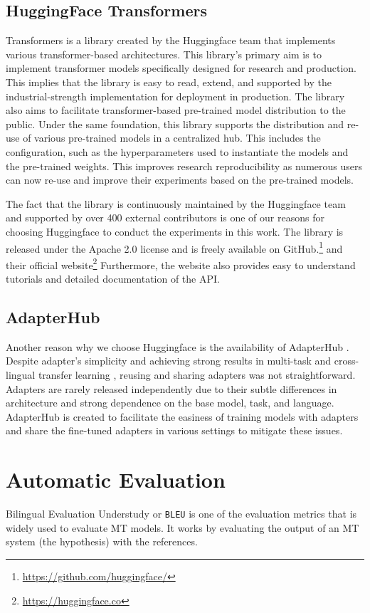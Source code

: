 \subsection{HuggingFace Transformers}
Transformers  is a library created by the Huggingface team that implements various transformer-based architectures. This library's primary aim is to implement transformer models specifically designed for research and production. This implies that the library is easy to read, extend, and supported by the industrial-strength implementation for deployment in production. The library also aims to facilitate transformer-based pre-trained model distribution to the public. Under the same foundation, this library supports the distribution and re-use of various pre-trained models in a centralized hub. This includes the configuration, such as the hyperparameters used to instantiate the models and the pre-trained weights. This improves research reproducibility as numerous users can now re-use and improve their experiments based on the pre-trained models.

The fact that the library is continuously maintained by the Huggingface team and supported by over 400 external contributors is one of our reasons for choosing Huggingface to conduct the experiments in this work. The library is released under the Apache 2.0 license and is freely available on GitHub.\footnote{\url{https://github.com/huggingface/}} and their official website\footnote{\url{https://huggingface.co}} Furthermore, the website also provides easy to understand tutorials and detailed documentation of the API.

\subsection{AdapterHub}
Another reason why we choose Huggingface is the availability of AdapterHub . Despite adapter's simplicity and achieving strong results in multi-task and cross-lingual transfer learning , reusing and sharing adapters was not straightforward. Adapters are rarely released independently due to their subtle differences in architecture and strong dependence on the base model, task, and language. AdapterHub is created to facilitate the easiness of training models with adapters and share the fine-tuned adapters in various settings to mitigate these issues.

\section{Automatic Evaluation}
\label{sec:aeval}
Bilingual Evaluation Understudy or \texttt{BLEU}  is one of the evaluation metrics that is widely used to evaluate MT models. It works by evaluating the output of an MT system (the hypothesis) with the references.

